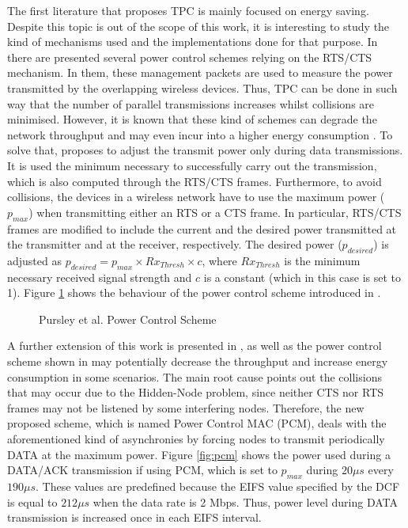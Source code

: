 \documentclass[12pt, a4paper,twoside]{tesi_upf}
\begin{document}
				The first literature that proposes TPC is mainly focused on energy saving. Despite this topic is out of the scope of this work, it is interesting to study the kind of mechanisms used and the implementations done for that purpose. In \cite{agarwal2001distributed, karn1990maca} there are presented several power control schemes relying on the RTS/CTS mechanism. In them, these management packets are used to measure the power transmitted by the overlapping wireless devices. Thus, TPC can be done in such way that the number of parallel transmissions increases whilst collisions are minimised. However, it is known that these kind of schemes can degrade the network throughput and may even incur into a higher energy consumption \cite{ebert1999combined}. To solve that, \cite{pursley2000energy} proposes to adjust the transmit power only during data transmissions. It is used the minimum necessary to successfully carry out the transmission, which is also computed through the RTS/CTS frames. Furthermore, to avoid collisions, the devices in a wireless network have to use the maximum power ($p_{max}$) when transmitting either an RTS or a CTS frame. In particular, RTS/CTS frames are modified to include the current and the desired power transmitted at the transmitter and at the receiver, respectively. The desired power ($p_{desired}$) is adjusted as $p_{desired} = p_{max} \times Rx_{Thresh} \times c$, where $Rx_{Thresh}$ is the minimum necessary received signal strength and $c$ is a constant (which in this case is set to 1). Figure \ref{fig:basic_tpc} shows the behaviour of the power control scheme introduced in \cite{pursley2000energy}.	
				\begin{figure}[h!]
					\centering
					\caption{Pursley et al. Power Control Scheme}
					\label{fig:basic_tpc}
				\end{figure}				
				A further extension of this work is presented in \cite{jung2002power}, as well as the power control scheme shown in \cite{pursley2000energy} may potentially decrease the throughput and increase energy consumption in some scenarios. The main root cause points out the collisions that may occur due to the Hidden-Node problem, since neither CTS nor RTS frames may not be listened by some interfering nodes. Therefore, the new proposed scheme, which is named Power Control MAC (PCM), deals with the aforementioned kind of asynchronies by forcing nodes to transmit periodically DATA at the maximum power. Figure \ref{fig:pcm} shows the power used during a DATA/ACK transmission if using PCM, which is set to $p_{max}$ during $20 \mu s$ every $190 \mu s$. These values are predefined because the EIFS value specified by the DCF is equal to $212 \mu s$ when the data rate is 2 Mbps. Thus, power level during DATA transmission is increased once in each EIFS interval.
\end{document}
